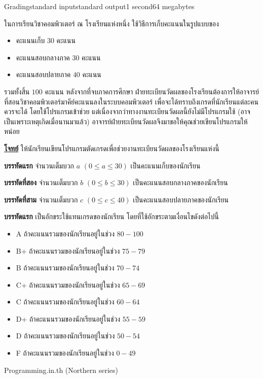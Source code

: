 \documentclass[11pt,a4paper]{article}
\begin{document}
\begin{problem}{Grading}{standard input}{standard output}{1 second}{64 megabytes}

ในการเรียนวิชาคอมพิวเตอร์ ณ โรงเรียนแห่งหนึ่ง ใช้วิธีการเก็บคะแนนในรูปแบบของ

\begin{itemize}
	\item คะแนนเก็บ $30$ คะแนน
    \item คะแนนสอบกลางภาค $30$ คะแนน
    \item คะแนนสอบปลายภาค $40$ คะแนน
\end{itemize} 
   
รวมทั้งสิ้น $100$ คะแนน หลังจากที่จบภาคการศึกษา ฝ่ายทะเบียนวัดผลของโรงเรียนต้องการให้อาจารย์ที่สอนวิชาคอมพิวเตอร์มาคีย์คะแนนลงในระบบคอมพิวเตอร์ เพื่อจะได้ทราบถึงเกรดที่นักเรียนแต่ละคนควรจะได้ โดยใช้โปรแกรมเข้าช่วย แต่เนื่องจากว่าทางงานทะเบียนวัดผลนี้ยังไม่มีโปรแกรมใช้ (อาจเป็นเพราะเหตุเกิดเมื่อนานมาแล้ว) อาจารย์ฝ่ายทะเบียนวัดผลจึงมาขอให้คุณช่วยเขียนโปรแกรมให้หน่อย

\underline{\textbf{โจทย์}} ให้นักเรียนเขียนโปรแกรมตัดเกรดเพื่อช่วยงานทะเบียนวัดผลของโรงเรียนแห่งนี้

\InputFile

\textbf{บรรทัดแรก} จำนวนเต็มบวก $a$ $(0 \leq a \leq 30)$ เป็นคะแนนเก็บของนักเรียน

\textbf{บรรทัดที่สอง} จำนวนเต็มบวก $b$ $(0 \leq b \leq 30)$ เป็นคะแนนสอบกลางภาคของนักเรียน

\textbf{บรรทัดที่สาม} จำนวนเต็มบวก $c$ $(0 \leq c \leq 40)$ เป็นคะแนนสอบปลายภาคของนักเรียน

\OutputFile

\textbf{บรรทัดแรก} เป็นอักขระใช้แทนเกรดของนักเรียน โดยที่ใช้อักขระตามเงื่อนไขดังต่อไปนี้
\begin{itemize}
    \item A ถ้าคะแนนรวมของนักเรียนอยู่ในช่วง $80 - 100$
    \item B+ ถ้าคะแนนรวมของนักเรียนอยู่ในช่วง $75 - 79$
    \item B ถ้าคะแนนรวมของนักเรียนอยู่ในช่วง $70 - 74$
    \item C+ ถ้าคะแนนรวมของนักเรียนอยู่ในช่วง $65 - 69$
    \item C ถ้าคะแนนรวมของนักเรียนอยู่ในช่วง $60 - 64$
    \item D+ ถ้าคะแนนรวมของนักเรียนอยู่ในช่วง $55 - 59$
    \item D ถ้าคะแนนรวมของนักเรียนอยู่ในช่วง $50 - 54$
    \item F ถ้าคะแนนรวมของนักเรียนอยู่ในช่วง $0 - 49$
\end{itemize}
\Examples

\begin{example}
%
\end{example}

\Source

 Programming.in.th (Northern series)

\end{problem}
\end{document}
